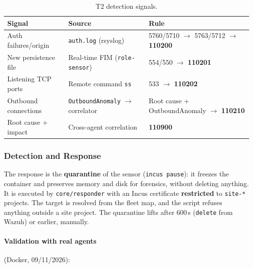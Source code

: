\documentclass[11pt,a4paper]{article}
\begin{document}
\begin{table}[H]
  \centering
  \caption{T2 detection signals.}
  \small
  \begin{tabular}{@{}p{2.8cm}p{4.8cm}p{4.8cm}@{}}
    \toprule
    \textbf{Signal} & \textbf{Source} & \textbf{Rule} \\
    \midrule
    Auth failures/origin & \texttt{auth.log} (rsyslog) &
      5760/5710 $\to$ 5763/5712 $\to$ \textbf{110200} \\
    New persistence file & Real-time FIM (\texttt{role-sensor}) &
      554/550 $\to$ \textbf{110201} \\
    Listening TCP ports & Remote command \texttt{ss} &
      533 $\to$ \textbf{110202} \\
    Outbound connections & \texttt{OutboundAnomaly} $\to$ correlator &
      Root cause + OutboundAnomaly $\to$ \textbf{110210} \\
    Root cause + impact & Cross-agent correlation &
      \textbf{110900} \\
    \bottomrule
  \end{tabular}
\end{table}

\subsubsection{Detection and Response}

The response is the \textbf{quarantine} of the sensor
(\texttt{incus~pause}): it freezes the container and preserves memory and disk
for forensics, without deleting anything. It is executed by
\texttt{core/\allowbreak responder} with an Incus certificate
\textbf{restricted} to \texttt{site-*} projects. The target is resolved from
the fleet map, and the script refuses anything outside a site project.
The quarantine lifts after 600\,s (\texttt{delete} from Wazuh) or earlier,
manually.

\paragraph{Validation with real agents} (Docker, 09/11/2026):
\end{document}
